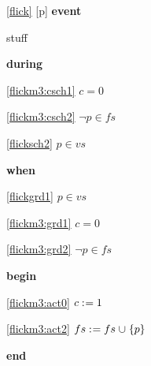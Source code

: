\noindent \ref{flick} [p] \textbf{event}
  \item   \begin{block}
    \item   stuff
  \end{block}
\begin{block}
  \item   \textbf{during}
  \begin{block}
  \item[ \eqref{flickm3:csch1} ]$c = 0 $ %
  \item[ \eqref{flickm3:csch2} ]$\neg p \in fs $ %
  \item[ \eqref{flicksch2} ]$p \in vs$ %
  \end{block}
  \item   \textbf{when}
  \begin{block}
  \item[ \eqref{flickgrd1} ]$p \in vs$ %
  \item[ \eqref{flickm3:grd1} ]$c = 0 $ %
  \item[ \eqref{flickm3:grd2} ]$\neg p \in fs $ %
  \end{block}
  \item   \textbf{begin}
  \begin{block}
  \item[ \eqref{flickm3:act0} ]$c \mathrel{:\mkern1mu=} 1$ %
  \item[ \eqref{flickm3:act2} ]$fs \mathrel{:\mkern1mu=} fs \mathbin{\mkern1mu\cup\mkern1mu} \{ p \} $ %
  \end{block}
  \item   \textbf{end} \\
\end{block}
